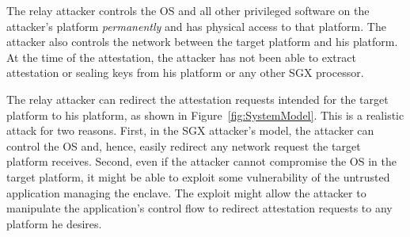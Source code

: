 The relay attacker controls the OS and all other privileged software on the attacker's platform \emph{permanently} and has physical access to that platform. The attacker also controls the network between the target platform and his platform. At the time of the attestation, the attacker has not been able to extract attestation or sealing keys from his platform or any other SGX processor.


 The relay attacker can redirect the attestation requests intended for the target platform to his platform, as shown in Figure~\ref{fig:SystemModel}. This is a realistic attack for two reasons. First, in the SGX attacker's model, the attacker can control the OS and, hence, easily redirect any network request the target platform receives. Second, even if the attacker cannot compromise the OS in the target platform, it might be able to exploit some vulnerability of the untrusted application managing the enclave. The exploit might allow the attacker to manipulate the application's control flow to redirect attestation requests to any platform he desires.




